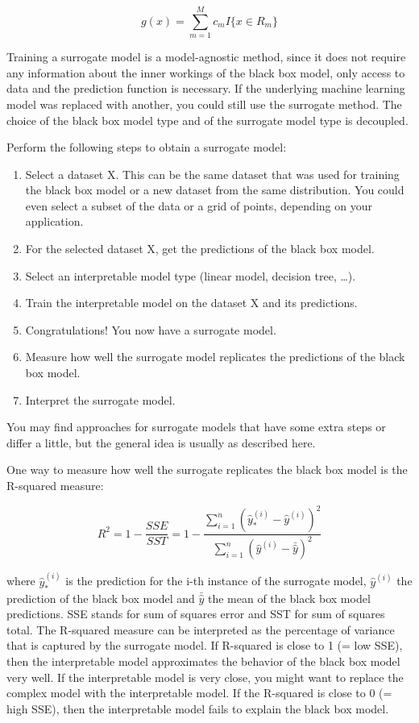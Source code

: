 \documentclass[12pt,]{krantz}
\providecommand{\tightlist}{%
  \setlength{\itemsep}{0pt}\setlength{\parskip}{0pt}}
\begin{document}
\[g(x)=\sum_{m=1}^Mc_m{}I\{x\in{}R_m\}\]

Training a surrogate model is a model-agnostic method, since it does not
require any information about the inner workings of the black box model,
only access to data and the prediction function is necessary. If the
underlying machine learning model was replaced with another, you could
still use the surrogate method. The choice of the black box model type
and of the surrogate model type is decoupled.

Perform the following steps to obtain a surrogate model:

\begin{enumerate}
\def\labelenumi{\arabic{enumi}.}
\tightlist
\item
  Select a dataset X. This can be the same dataset that was used for
  training the black box model or a new dataset from the same
  distribution. You could even select a subset of the data or a grid of
  points, depending on your application.
\item
  For the selected dataset X, get the predictions of the black box
  model.
\item
  Select an interpretable model type (linear model, decision tree,
  \ldots{}).
\item
  Train the interpretable model on the dataset X and its predictions.
\item
  Congratulations! You now have a surrogate model.
\item
  Measure how well the surrogate model replicates the predictions of the
  black box model.
\item
  Interpret the surrogate model.
\end{enumerate}

You may find approaches for surrogate models that have some extra steps
or differ a little, but the general idea is usually as described here.

One way to measure how well the surrogate replicates the black box model
is the R-squared measure:

\[R^2=1-\frac{SSE}{SST}=1-\frac{\sum_{i=1}^n(\hat{y}_*^{(i)}-\hat{y}^{(i)})^2}{\sum_{i=1}^n(\hat{y}^{(i)}-\bar{\hat{y}})^2}\]

where \(\hat{y}_*^{(i)}\) is the prediction for the i-th instance of the
surrogate model, \(\hat{y}^{(i)}\) the prediction of the black box model
and \(\bar{\hat{y}}\) the mean of the black box model predictions. SSE
stands for sum of squares error and SST for sum of squares total. The
R-squared measure can be interpreted as the percentage of variance that
is captured by the surrogate model. If R-squared is close to 1 (= low
SSE), then the interpretable model approximates the behavior of the
black box model very well. If the interpretable model is very close, you
might want to replace the complex model with the interpretable model. If
the R-squared is close to 0 (= high SSE), then the interpretable model
fails to explain the black box model.
\end{document}
